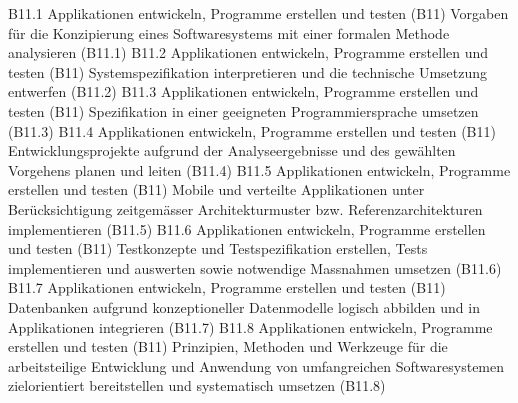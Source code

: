 \templateCard
  {B11.1}
  {Applikationen entwickeln, Programme erstellen und testen (B11)}
  {Vorgaben für die Konzipierung eines Softwaresystems mit einer formalen Methode analysieren (B11.1)}
\templateCard
  {B11.2}
  {Applikationen entwickeln, Programme erstellen und testen (B11)}
  {Systemspezifikation interpretieren und die technische Umsetzung entwerfen (B11.2)}
\templateCard
  {B11.3}
  {Applikationen entwickeln, Programme erstellen und testen (B11)}
  {Spezifikation in einer geeigneten Programmiersprache umsetzen (B11.3)}
\templateCard
  {B11.4}
  {Applikationen entwickeln, Programme erstellen und testen (B11)}
  {Entwicklungsprojekte aufgrund der Analyseergebnisse und des gewählten Vorgehens planen und leiten (B11.4)}
\templateCard
  {B11.5}
  {Applikationen entwickeln, Programme erstellen und testen (B11)}
  {Mobile und verteilte Applikationen unter Berücksichtigung zeitgemässer Architekturmuster bzw. Referenzarchitekturen implementieren (B11.5)}
\templateCard
  {B11.6}
  {Applikationen entwickeln, Programme erstellen und testen (B11)}
  {Testkonzepte und Testspezifikation erstellen, Tests implementieren und auswerten sowie notwendige Massnahmen umsetzen (B11.6)}
\templateCard
  {B11.7}
  {Applikationen entwickeln, Programme erstellen und testen (B11)}
  {Datenbanken aufgrund konzeptioneller Datenmodelle logisch abbilden und in Applikationen integrieren (B11.7)}
\templateCard
  {B11.8}
  {Applikationen entwickeln, Programme erstellen und testen (B11)}
  {Prinzipien, Methoden und Werkzeuge für die arbeitsteilige Entwicklung und Anwendung von umfangreichen Softwaresystemen zielorientiert bereitstellen und systematisch umsetzen (B11.8)}
